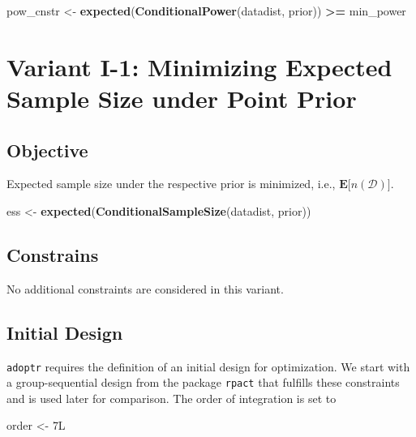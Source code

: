 \documentclass[]{book}
\newenvironment{Shaded}{\begin{snugshade}}{\end{snugshade}}
\newcommand{\KeywordTok}[1]{\textcolor[rgb]{0.13,0.29,0.53}{\textbf{#1}}}
\newcommand{\NormalTok}[1]{#1}
\newcommand{\OperatorTok}[1]{\textcolor[rgb]{0.81,0.36,0.00}{\textbf{#1}}}
\newcommand{\StringTok}[1]{\textcolor[rgb]{0.31,0.60,0.02}{#1}}
\begin{document}
\begin{Shaded}
\begin{Highlighting}[]
\NormalTok{pow_cnstr <-}\StringTok{ }\KeywordTok{expected}\NormalTok{(}\KeywordTok{ConditionalPower}\NormalTok{(datadist, prior)) }\OperatorTok{>=}\StringTok{ }\NormalTok{min_power}
\end{Highlighting}
\end{Shaded}

\hypertarget{variantI_1}{%
\section{Variant I-1: Minimizing Expected Sample Size under Point Prior}\label{variantI_1}}

\hypertarget{objective}{%
\subsection{Objective}\label{objective}}

Expected sample size under the respective prior is minimized, i.e.,
\(\boldsymbol{E}\big[n(\mathcal{D})\big]\).

\begin{Shaded}
\begin{Highlighting}[]
\NormalTok{ess <-}\StringTok{ }\KeywordTok{expected}\NormalTok{(}\KeywordTok{ConditionalSampleSize}\NormalTok{(datadist, prior))}
\end{Highlighting}
\end{Shaded}

\hypertarget{constrains}{%
\subsection{Constrains}\label{constrains}}

No additional constraints are considered in this variant.

\hypertarget{initial-design}{%
\subsection{Initial Design}\label{initial-design}}

\texttt{adoptr} requires the definition of an initial design for optimization.
We start with a group-sequential design from the package \texttt{rpact} that
fulfills these constraints and is used later for comparison.
The order of integration is set to

\begin{Shaded}
\begin{Highlighting}[]
\NormalTok{order <-}\StringTok{ }\NormalTok{7L}
\end{Highlighting}
\end{Shaded}
\end{document}
